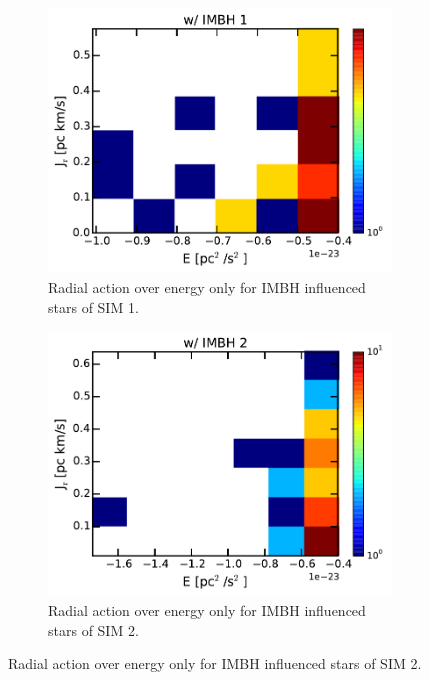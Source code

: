 \begin{figure}[htbp]
\centering
	\begin{subfigure}{0.475\textwidth}
	\centering
	\includegraphics[width=\textwidth]{Plots/E_J_r_justIMBH_hist_IMBH1.pdf}
	\caption{Radial action over energy only for \ac{IMBH} influenced stars of SIM 1.}
	\label{fig:E_J_r_justIMBH_1}
	\end{subfigure}
	\hfill
	\begin{subfigure}{0.475\textwidth}
	\centering
	\includegraphics[width=\textwidth]{Plots/E_J_r_justIMBH_hist_IMBH2.pdf}
	\caption{Radial action over energy only for \ac{IMBH} influenced stars of SIM 2.}
	\label{fig:_E_r_justIMBH_2}
	\end{subfigure}	

\end{figure}
